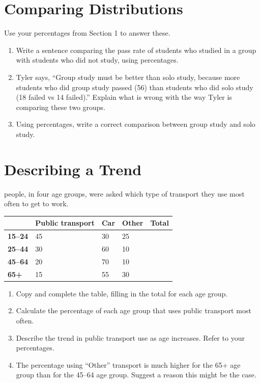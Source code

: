 \documentclass[11pt]{article}
\newcommand{\ans}{\hrulefill}
\newcommand{\anshere}{\par\vspace{0.3em}\noindent\ans\par\vspace{0.3em}}
\begin{document}
\section{Comparing Distributions}
\noindent Use your percentages from Section 1 to answer these.

\begin{enumerate}
  \item Write a sentence comparing the pass rate of students who studied in a group with
    students who did not study, using percentages.
  \anshere
  \item Tyler says, ``Group study must be better than solo study, because more students
    who did group study passed (56) than students who did solo study (18 failed vs 14
    failed).'' Explain what is wrong with the way Tyler is comparing these two groups.
  \anshere
  \item Using percentages, write a correct comparison between group study and solo
    study.
  \anshere
\end{enumerate}

\section{Describing a Trend}
 people, in four age groups, were asked which type of transport they use
most often to get to work.

\begin{center}
\begin{tabular}{|L|Y|Y|Y|Y|}
\hline
 & \textbf{Public transport} & \textbf{Car} & \textbf{Other} & \textbf{Total} \\\hline
\textbf{15--24} & 45 & 30 & 25 & \\\hline
\textbf{25--44} & 30 & 60 & 10 & \\\hline
\textbf{45--64} & 20 & 70 & 10 & \\\hline
\textbf{65+}    & 15 & 55 & 30 & \\\hline
\end{tabular}
\end{center}

\begin{enumerate}
  \item Copy and complete the table, filling in the total for each age group.
  \item Calculate the percentage of each age group that uses public transport most
    often.
  \anshere
  \item Describe the trend in public transport use as age increases. Refer to your
    percentages.
  \anshere
  \item The percentage using ``Other'' transport is much higher for the 65+ age group
    than for the 45--64 age group. Suggest a reason this might be the case.
  \anshere
\end{enumerate}
\end{document}
